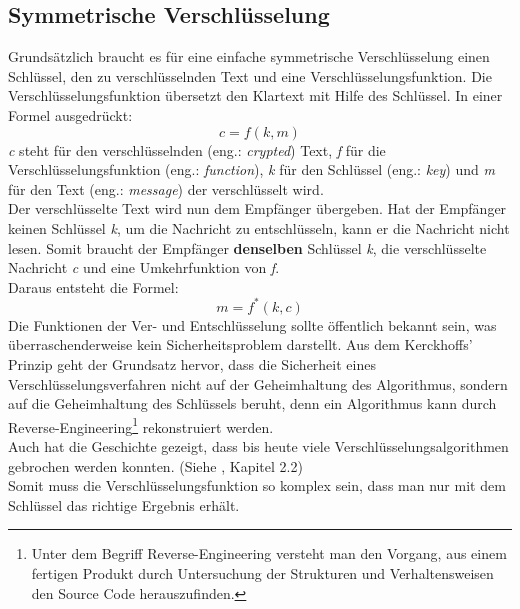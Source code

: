 \subsection{Symmetrische Verschlüsselung}
Grundsätzlich braucht es für eine einfache symmetrische Verschlüsselung einen Schlüssel, den zu verschlüsselnden Text und eine Verschlüsselungsfunktion.
Die Verschlüsselungs\-funktion übersetzt den Klartext mit Hilfe des Schlüssel. In einer Formel ausgedrückt:
\begin{equation*}
  c = f ( k, m )
\label{eqn:sym_versch}
\end{equation*}
\textit{c} steht für den verschlüsselnden  (eng.: \textit{crypted}) Text, \textit{f} für die Verschlüsselungsfunktion (eng.: \textit{function}), \textit{k} für den Schlüssel (eng.: \textit{key}) und \textit{m} für den Text (eng.: \textit{message}) der verschlüsselt wird.\\
%
Der verschlüsselte Text wird nun dem Empfänger übergeben. Hat der Empfänger keinen Schlüssel \textit{k}, um die Nachricht zu entschlüsseln, kann er die Nachricht nicht lesen. Somit braucht der Empfänger \textbf{denselben} Schlüssel \textit{k}, die verschlüsselte Nachricht \textit{c} und eine Umkehrfunktion von \textit{f}.\\
Daraus entsteht die Formel:
\begin{equation*}
  m = f^*(k ,c)
\label{eqn:sym_entsch}
\end{equation*}
Die Funktionen der Ver- und Entschlüsselung sollte öffentlich bekannt sein, was über\-raschender\-weise kein Sicherheitsproblem darstellt. Aus dem Kerckhoffs' Prinzip geht der Grundsatz hervor, dass die Sicherheit eines Verschlüsselungsverfahren nicht auf der Geheimhaltung des Algorithmus, sondern auf die Geheimhaltung des Schlüssels beruht, denn ein Algorithmus kann durch Reverse-Engineering\footnote{Unter dem Begriff Reverse-Engineering versteht man den Vorgang, aus einem fertigen Produkt durch Untersuchung der Strukturen und Verhaltensweisen den Source Code herauszufinden.} rekonstruiert werden.\\
Auch hat die Geschichte gezeigt, dass bis heute viele Verschlüsselungsalgorithmen gebrochen werden konnten. (Siehe \cite{kryptographie}, Kapitel 2.2)\\
%
Somit muss die Verschlüsselungsfunktion so komplex sein, dass man nur mit dem Schlüssel das richtige Ergebnis erhält.
%
